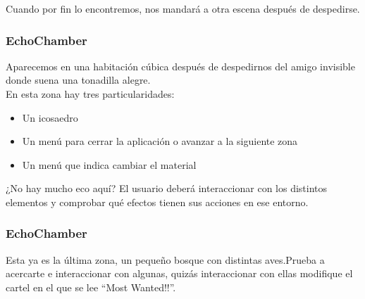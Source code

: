 \quad Cuando por fin lo encontremos, nos mandará a otra escena después de despedirse.\\

\subsubsection{EchoChamber}

\quad Aparecemos en una habitación cúbica después de despedirnos del amigo invisible donde suena una tonadilla alegre.\\

\quad En esta zona hay tres particularidades:
\begin{itemize}
	\item Un icosaedro
	\item Un menú para cerrar la aplicación o avanzar a la siguiente zona
	\item Un menú que indica cambiar el material  
\end{itemize}

\quad ¿No hay mucho eco aquí? El usuario deberá interaccionar con los distintos elementos y comprobar qué efectos tienen sus acciones en ese entorno.  

\subsubsection{EchoChamber}

\quad Esta ya es la última zona, un pequeño bosque con distintas aves.Prueba a acercarte e interaccionar con algunas, quizás interaccionar con ellas modifique el cartel en el que se lee “Most Wanted!!”.\\

\newpage




